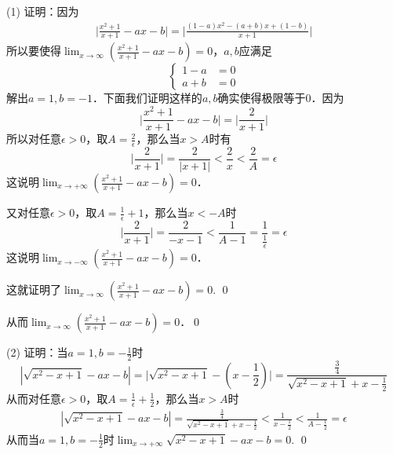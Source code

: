 \noindent (1) 证明：因为
\begin{align}
    \bigg\lvert\displaystyle\frac{x^2+1}{x+1}-a x - b\bigg\rvert=\bigg\lvert \displaystyle\frac{(1-a)x^2 - (a+b)x +(1-b)}{x+1} \bigg\rvert
\end{align}
所以要使得$\displaystyle\lim_{x\to\infty}\left(\displaystyle\frac{x^2+1}{x+1}-ax-b\right)=0$，$a,b$应满足
\begin{equation}
    \begin{cases}
        1-a &= 0\\
        a+b &= 0
    \end{cases}
\end{equation}
解出$a=1,b=-1$．下面我们证明这样的$a,b$确实使得极限等于$0$．因为
\begin{equation}
    \bigg\lvert\displaystyle\frac{x^2+1}{x+1}-ax-b\bigg\rvert = \bigg\lvert\displaystyle\frac{2}{x+1}\bigg\rvert
\end{equation}
所以对任意$\epsilon > 0$，取$A=\displaystyle\frac{2}{\epsilon}$，那么当$x>A$时有
\begin{equation}
    \bigg\lvert\displaystyle\frac{2}{x+1}\bigg\rvert=\frac{2}{|x+1|}<\frac{2}{x}<\frac{2}{A}=\epsilon
\end{equation}
这说明$\displaystyle\lim_{x\to +\infty}\left(\displaystyle\frac{x^2+1}{x+1}-ax-b\right)=0$．

\noindent 又对任意$\epsilon>0$，取$A=\displaystyle\frac{1}{\epsilon}+1$，那么当$x<-A$时
\begin{equation}
    \bigg\lvert\displaystyle\frac{2}{x+1}\bigg\rvert=\frac{2}{-x-1}<\frac{1}{A-1}=\frac{1}{\displaystyle\frac{1}{\epsilon}}=\epsilon
\end{equation}
这说明$\displaystyle\lim_{x\to -\infty}\left(\displaystyle\frac{x^2+1}{x+1}-ax-b\right)=0$．

\noindent 这就证明了$\displaystyle\lim_{x \to \infty}\left(\displaystyle\frac{x^2+1}{x+1}-ax-b\right)=0$. \qed

\noindent 从而$\displaystyle\lim_{x\to\infty}\left(\displaystyle\frac{x^2+1}{x+1}-ax-b\right)=0$．\qed

\noindent (2) 证明：当$a=1,b=-\displaystyle\frac{1}{2}$时
\begin{equation}
    |\sqrt{x^2-x+1}-ax-b|=\bigg\lvert\sqrt{x^2-x+1}-(x-\displaystyle\frac{1}{2})\bigg\rvert=\displaystyle\frac{\displaystyle\frac{3}{4}}{\sqrt{x^2-x+1}+x-\displaystyle\frac{1}{2}}
\end{equation}
从而对任意$\epsilon > 0$，取$A=\displaystyle\frac{1}{\epsilon}+\displaystyle\frac{1}{2}$，那么当$x>A$时
\begin{align}
    |\sqrt{x^2-x+1}-ax-b|=\displaystyle\frac{\displaystyle\frac{3}{4}}{\sqrt{x^2-x+1}+x-\displaystyle\frac{1}{2}} < \displaystyle\frac{1}{x-\displaystyle\frac{1}{2}}<\displaystyle\frac{1}{A-\displaystyle\frac{1}{2}}=\epsilon
\end{align}
从而当$a=1,b=-\displaystyle\frac{1}{2}$时$\displaystyle\lim_{x\to +\infty}\sqrt{x^2-x+1}-ax-b=0$. \qed

